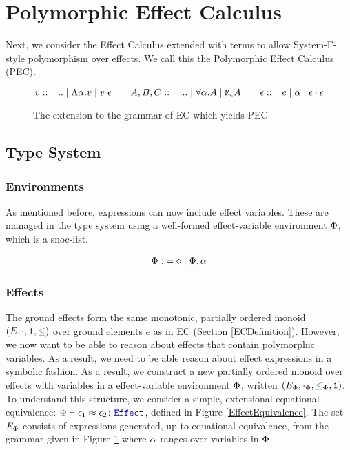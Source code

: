 \documentclass{Report}
\begin{document}
\section{Polymorphic Effect Calculus}

Next, we consider the Effect Calculus extended with terms to allow System-F-style polymorphism over effects. We call this the Polymorphic Effect Calculus (PEC).

\begin{figure}[H]
    \centering
    \begin{framed}
        
\[
    v::=\text{..}\mid\elam{\a}{v}\mid\eapp{v}{\e}
    \quad\quad
    A, B, C::=\text{...}\mid \all{\a}{A}\mid\mea
    \quad\quad
    \e ::= e \mid \a \mid \e\dot\e
\]
    \end{framed}
    \caption{The extension to the grammar of EC which yields PEC}
    \label{PECExtension}
\end{figure}

\subsection{Type System}
\subsubsection{Environments}
As mentioned before, expressions can now include effect variables. These are managed in the type system using a well-formed effect-variable environment $\P$, which is a snoc-list.

\begin{align*}
    \P ::= \nil \mid \P, \a
\end{align*}



\subsubsection{Effects}
The ground effects form the same monotonic, partially ordered monoid $(E, \dot, \1, \subeffect)$ over ground elements $e$ as in EC (Section \ref{ECDefinition}). However, we now want to be able to reason about effects that contain polymorphic variables. As a  result, we need to be able reason about effect expressions in a symbolic fashion. As a result, we construct a new partially ordered monoid over effects with variables in a effect-variable environment $\P$, written $(E_\P, \dotp, \subeffectp, \1)$. To understand this structure, we consider a simple, extensional equational equivalence: $\zpberelation{\e_1}{\e_2}{\effect}$, defined in Figure \ref{EffectEquivalence}. The set $E_\P$ consists of expressions generated, up to equational equivalence, from the grammar given in Figure \ref{PECExtension} where $\a$ ranges over variables in $\P$.
\end{document}
